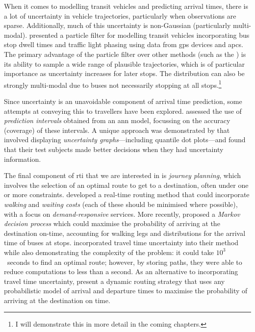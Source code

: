 When it comes to modelling transit vehicles and predicting arrival times, there is a lot of uncertainty in vehicle trajectories, particularly when observations are sparse. Additionally, much of this uncertainty is non-Gaussian (particularly multi-modal).  presented a particle filter for modelling transit vehicles incorporating bus stop dwell times and traffic light phasing using data from \gls{gps} devices and \glspl{apc}. The primary advantage of the particle filter over other methods (such as the \kf{}) is its ability to sample a wide range of plausible trajectories, which is of particular importance as uncertainty increases for later stops. The distribution can also be strongly multi-modal due to buses not necessarily stopping at all stops.\footnote{I will demonstrate this in more detail in the coming chapters.}


Since uncertainty is an unavoidable component of arrival time prediction, some attempts at conveying this to travellers have been explored.  assessed the use of \emph{prediction intervals} obtained from an \gls{ann} model, focussing on the accuracy (coverage) of these intervals. A unique approach was demonstrated by \citet{Fernandes_2018} that involved displaying \emph{uncertainty graphs}---including quantile dot plots---and found that their test subjects made better decisions when they had uncertainty information.


The final component of \gls{rti} that we are interested in is \emph{journey planning}, which involves the selection of an optimal route to get to a destination, often under one or more constraints.  developed a real-time routing method that could incorporate \emph{walking} and \emph{waiting costs} (each of these should be minimised where possible), with a focus on \emph{demand-responsive} services. More recently, \citet{Hame_2013a,Hame_2013b} proposed a \emph{Markov decision process} which could maximise the probability of arriving at the destination on-time, accounting for walking legs and distributions for the arrival time of buses at stops.  \citet{Zheng_2016} incorporated travel time uncertainty into their method while also demonstrating the complexity of the problem:  it could take $10^3$~seconds to find an optimal route; however, by storing paths, they were able to reduce computations to less than a second. As an alternative to incorporating travel time uncertainty, \citet{Berczi_2017} present a dynamic routing strategy that uses any probabilistic model of arrival and departure times to maximise the probability of arriving at the destination on time.


